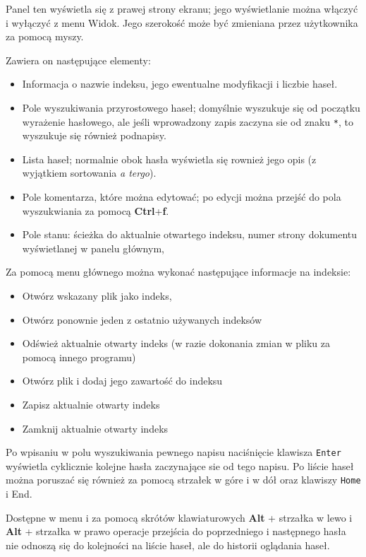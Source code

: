 \documentclass{mwart}
\def\key#1{\textbf{#1}}
\begin{document}
Panel ten wyświetla się z prawej strony ekranu; jego wyświetlanie
można włączyć i wyłączyć z menu \textsf{Widok}. Jego szerokość może
być zmieniana przez użytkownika za pomocą myszy.

Zawiera on następujące elementy:
\begin{itemize}
\item Informacja o nazwie indeksu, jego ewentualne modyfikacji i liczbie haseł.
\item Pole wyszukiwania przyrostowego haseł; domyślnie wyszukuje się
  od początku wyrażenie hasłowego, ale jeśli wprowadzony zapis zaczyna
  sie od znaku \texttt{*}, to wyszukuje się również podnapisy.
\item Lista haseł; normalnie obok hasła wyświetla się rownież jego
  opis (z wyjątkiem sortowania \textit{a tergo}).
\item Pole komentarza, które można edytować; po edycji można przejść
  do pola wyszukwiania za pomocą \key{Ctrl}+\key{f}.
\item Pole stanu: ścieżka do aktualnie otwartego indeksu, numer strony
  dokumentu wyświetlanej w panelu głównym,
\end{itemize}

Za pomocą menu głównego można wykonać następujące informacje na
indeksie:
\begin{itemize}
\item Otwórz wskazany plik jako indeks,
\item Otwórz ponownie jeden z ostatnio używanych indeksów
\item Odśwież aktualnie otwarty indeks (w razie dokonania zmian w
  pliku za pomocą innego programu)
\item Otwórz plik i dodaj jego zawartość do indeksu
\item Zapisz aktualnie otwarty indeks
\item Zamknij aktualnie otwarty indeks
\end{itemize} 

Po wpisaniu w polu wyszukiwania pewnego napisu naciśnięcie klawisza
\texttt{Enter} wyświetla cyklicznie kolejne hasła zaczynające sie od
tego napisu. Po liście haseł można poruszać się również za pomocą
strzałek w góre i w dół oraz klawiszy \texttt{Home} i \textup{End}.

Dostępne w menu i za pomocą skrótów klawiaturowych \key{Alt} +
strzałka w lewo i \key{Alt} + strzałka w prawo operacje przejścia do
poprzedniego i następnego hasła nie odnoszą się do kolejności na
liście haseł, ale do historii oglądania haseł.
\end{document}
